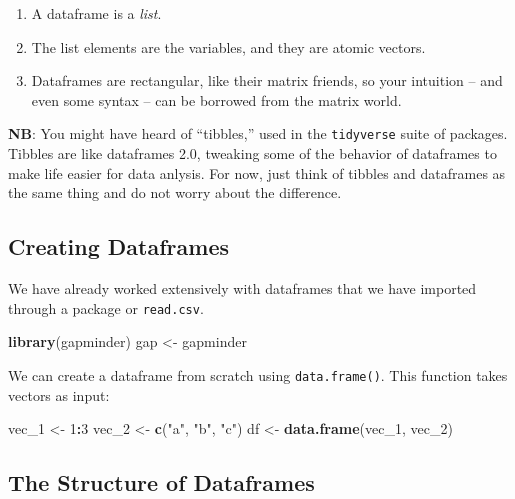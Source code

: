 \documentclass[]{book}
\newenvironment{Shaded}{\begin{snugshade}}{\end{snugshade}}
\newcommand{\KeywordTok}[1]{\textcolor[rgb]{0.13,0.29,0.53}{\textbf{#1}}}
\newcommand{\DecValTok}[1]{\textcolor[rgb]{0.00,0.00,0.81}{#1}}
\newcommand{\StringTok}[1]{\textcolor[rgb]{0.31,0.60,0.02}{#1}}
\newcommand{\OperatorTok}[1]{\textcolor[rgb]{0.81,0.36,0.00}{\textbf{#1}}}
\newcommand{\NormalTok}[1]{#1}
\providecommand{\tightlist}{%
  \setlength{\itemsep}{0pt}\setlength{\parskip}{0pt}}
\begin{document}
\begin{enumerate}
\def\labelenumi{\arabic{enumi}.}
\tightlist
\item
  A dataframe is a \emph{list}.
\item
  The list elements are the variables, and they are atomic vectors.
\item
  Dataframes are rectangular, like their matrix friends, so your
  intuition -- and even some syntax -- can be borrowed from the matrix
  world.
\end{enumerate}

\textbf{NB}: You might have heard of ``tibbles,'' used in the
\texttt{tidyverse} suite of packages. Tibbles are like dataframes 2.0,
tweaking some of the behavior of dataframes to make life easier for data
anlysis. For now, just think of tibbles and dataframes as the same thing
and do not worry about the difference.

\subsection{Creating Dataframes}\label{creating-dataframes}

We have already worked extensively with dataframes that we have imported
through a package or \texttt{read.csv}.

\begin{Shaded}
\begin{Highlighting}[]
\KeywordTok{library}\NormalTok{(gapminder)}
\NormalTok{gap <-}\StringTok{ }\NormalTok{gapminder}
\end{Highlighting}
\end{Shaded}

We can create a dataframe from scratch using \texttt{data.frame()}. This
function takes vectors as input:

\begin{Shaded}
\begin{Highlighting}[]
\NormalTok{vec_}\DecValTok{1}\NormalTok{ <-}\StringTok{ }\DecValTok{1}\OperatorTok{:}\DecValTok{3}
\NormalTok{vec_}\DecValTok{2}\NormalTok{ <-}\StringTok{ }\KeywordTok{c}\NormalTok{(}\StringTok{"a"}\NormalTok{, }\StringTok{"b"}\NormalTok{, }\StringTok{"c"}\NormalTok{)}
\NormalTok{df <-}\StringTok{ }\KeywordTok{data.frame}\NormalTok{(vec_}\DecValTok{1}\NormalTok{, vec_}\DecValTok{2}\NormalTok{)}
\end{Highlighting}
\end{Shaded}

\subsection{The Structure of
Dataframes}\label{the-structure-of-dataframes}
\end{document}

